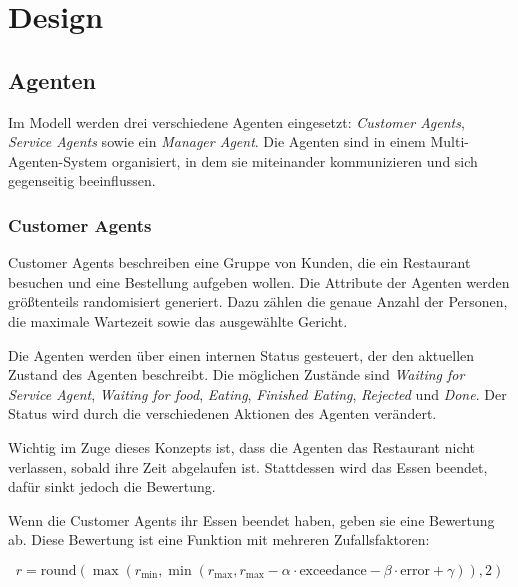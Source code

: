
\chapter{Design}
\label{chap:design}

\section{Agenten}
\label{sec:agenten}

Im Modell werden drei verschiedene Agenten eingesetzt: \emph{Customer Agents}, \emph{Service Agents} sowie ein \emph{Manager Agent}. Die Agenten sind in einem Multi-Agenten-System organisiert, in dem sie miteinander kommunizieren und sich gegenseitig beeinflussen.

\subsection{Customer Agents}
\label{subsec:customer_agents}
Customer Agents beschreiben eine Gruppe von Kunden, die ein Restaurant besuchen und eine Bestellung aufgeben wollen. Die Attribute der Agenten werden größtenteils randomisiert generiert. Dazu zählen die genaue Anzahl der Personen, die maximale Wartezeit sowie das ausgewählte Gericht.

Die Agenten werden über einen internen Status gesteuert, der den aktuellen Zustand des Agenten beschreibt. Die möglichen Zustände sind \emph{Waiting for Service Agent}, \emph{Waiting for food}, \emph{Eating}, \emph{Finished Eating}, \emph{Rejected} und \emph{Done}. Der Status wird durch die verschiedenen Aktionen des Agenten verändert. 

Wichtig im Zuge dieses Konzepts ist, dass die Agenten das Restaurant nicht verlassen, sobald ihre Zeit abgelaufen ist. Stattdessen wird das Essen beendet, dafür sinkt jedoch die Bewertung.

Wenn die Customer Agents ihr Essen beendet haben, geben sie eine Bewertung ab. Diese Bewertung ist eine Funktion mit mehreren Zufallsfaktoren:

\begin{equation*}
    r = \text{round}\left(\max\left(r_{\text{min}}, \min\left(r_{\text{max}}, r_{\text{max}} - \alpha \cdot \text{exceedance} - \beta \cdot \text{error} + \gamma\right)\right), 2\right)
\end{equation*}

